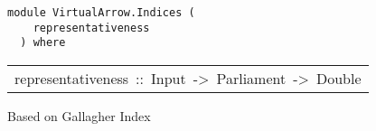 \label{module:VirtualArrow.Indices}
\haddockbeginheader
{\haddockverb\begin{verbatim}
module VirtualArrow.Indices (
    representativeness
  ) where\end{verbatim}}
\haddockendheader

\begin{haddockdesc}
\item[\begin{tabular}{@{}l}
representativeness\ ::\ Input\ ->\ Parliament\ ->\ Double
\end{tabular}]\haddockbegindoc
Based on Gallagher Index\par

\end{haddockdesc}